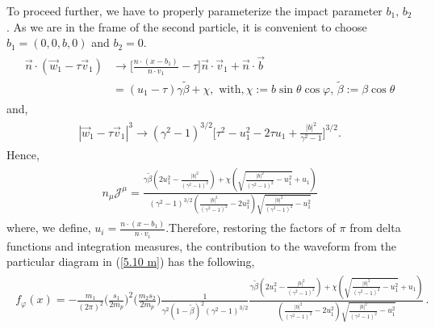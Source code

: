 To proceed further, we have to properly parameterize the impact parameter $b_1,\,b_2$. As we are in the frame of the second particle, it is convenient to choose $b_1=(0,0,b,0)$ and $b_2=0$.
\begin{align}
    \begin{split}
       \vec n\cdot (\vec w_1-\tau \vec v_1)&\rightarrow \Big[\frac{n\cdot (x-b_1)}{n\cdot v_1}-\tau\Big]\vec n\cdot \vec v_1+\vec n\cdot \vec b\\ &
       =(u_1-\tau)\gamma\tilde\beta+\chi,\,\,\text{with},\chi:=b\sin\theta\cos\varphi,\,\tilde\beta:=\beta \cos\theta
    \end{split}
\end{align}
and,
\begin{align}
    \begin{split}
        |\vec w_1-\tau \vec v_1|^3\rightarrow (\gamma^2-1)^{3/2}\Big[\tau^2-u_1^2-2\tau u_1+\frac{|b|^2}{\gamma^2-1}\Big]^{3/2}.
    \end{split}
\end{align}
Hence, 
\begin{align}
    \begin{split}
    n_{\mu}\mathcal{J}^{\mu}=\frac{\gamma  \tilde{\beta } \left(2 u_1^2-\frac{|b|^2}{\left(\gamma ^2-1\right)^2}\right)+\chi  \left(\sqrt{\frac{|b|^2}{\left(\gamma ^2-1\right)^2}-u_1^2}+u_1\right)}{(\gamma^2-1)^{3/2}\left(\frac{|b|^2}{\left(\gamma ^2-1\right)^2}-2 u_1^2\right) \sqrt{\frac{|b|^2}{\left(\gamma ^2-1\right)^2}-u_1^2}}
    \end{split}
\end{align}
where, we define, $u_i=\frac{n\cdot (x-b_1)}{n\cdot v_i}$.Therefore, restoring the factors of $\pi$ from delta functions and integration measures, the contribution to the waveform from the particular diagram in  (\ref{5.10 m}) has the following,
\begin{align}\begin{split}\label{5.24 mmm}
 f_{\varphi}(x)= -\frac{m_1}{(2\pi)^2}\Big(\frac{s_1}{2m_p}\Big)^2 \Big(\frac{m_2s_2}{2m_p}\Big)\frac{1}{\gamma^2(1-\tilde\beta)^2(\gamma^2-1)^{3/2}}\frac{\gamma  \tilde{\beta } \left(2 u_1^2-\frac{|b|^2}{\left(\gamma ^2-1\right)^2}\right)+\chi  \left(\sqrt{\frac{|b|^2}{\left(\gamma ^2-1\right)^2}-u_1^2}+u_1\right)}{\left(\frac{|b|^2}{\left(\gamma ^2-1\right)^2}-2 u_1^2\right) \sqrt{\frac{|b|^2}{\left(\gamma ^2-1\right)^2}-u_1^2}}\,.
\\
 \end{split}
\end{align}
